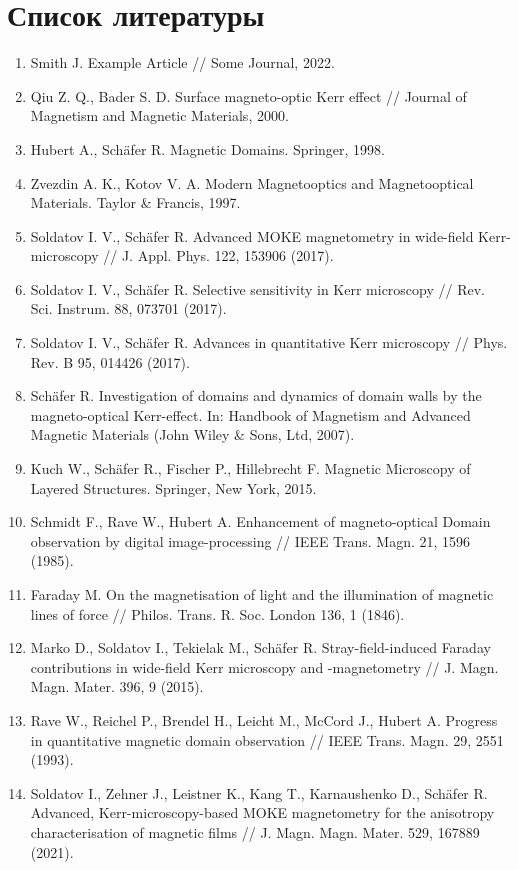\documentclass[12pt,a4paper]{article}
\numberwithin{equation}{section}
\begin{document}
\newpage

\section*{Список литературы} \vspace{-4mm}
\begin{enumerate}
  \item Smith J. Example Article // Some Journal, 2022.
  \item Qiu Z. Q., Bader S. D. Surface magneto-optic Kerr effect // Journal of Magnetism and Magnetic Materials, 2000.
  \item Hubert A., Schäfer R. Magnetic Domains. Springer, 1998.
  \item Zvezdin A. K., Kotov V. A. Modern Magnetooptics and Magnetooptical Materials. Taylor \& Francis, 1997.
  \item Soldatov I. V., Schäfer R. Advanced MOKE magnetometry in wide-field Kerr-microscopy // J. Appl. Phys. 122, 153906 (2017).
  \item Soldatov I. V., Schäfer R. Selective sensitivity in Kerr microscopy // Rev. Sci. Instrum. 88, 073701 (2017).
  \item Soldatov I. V., Schäfer R. Advances in quantitative Kerr microscopy // Phys. Rev. B 95, 014426 (2017).
  \item Schäfer R. Investigation of domains and dynamics of domain walls by the magneto-optical Kerr-effect. In: Handbook of Magnetism and Advanced Magnetic Materials (John Wiley \& Sons, Ltd, 2007).
  \item Kuch W., Schäfer R., Fischer P., Hillebrecht F. Magnetic Microscopy of Layered Structures. Springer, New York, 2015.
  \item Schmidt F., Rave W., Hubert A. Enhancement of magneto-optical Domain observation by digital image-processing // IEEE Trans. Magn. 21, 1596 (1985).
  \item Faraday M. On the magnetisation of light and the illumination of magnetic lines of force // Philos. Trans. R. Soc. London 136, 1 (1846).
  \item Marko D., Soldatov I., Tekielak M., Schäfer R. Stray-field-induced Faraday contributions in wide-field Kerr microscopy and -magnetometry // J. Magn. Magn. Mater. 396, 9 (2015).
  \item Rave W., Reichel P., Brendel H., Leicht M., McCord J., Hubert A. Progress in quantitative magnetic domain observation // IEEE Trans. Magn. 29, 2551 (1993).
  \item Soldatov I., Zehner J., Leistner K., Kang T., Karnaushenko D., Schäfer R. Advanced, Kerr-microscopy-based MOKE magnetometry for the anisotropy characterisation of magnetic films // J. Magn. Magn. Mater. 529, 167889 (2021).

\end{enumerate}
\end{document}
